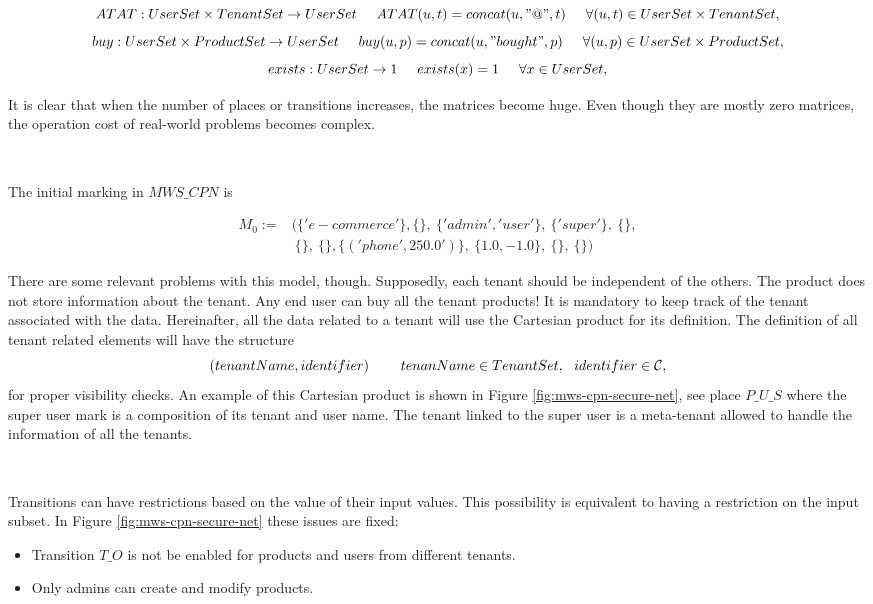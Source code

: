 \documentclass[12pt,english]{article} %
\begin{document}
$$ATAT: UserSet\times TenantSet\rightarrow UserSet\hspace{0.5cm}ATAT(u,t)=concat(u,"@",t) \hspace{0.5cm}\forall (u,t)\in UserSet\times TenantSet,$$
$$buy: UserSet\times ProductSet\rightarrow UserSet\hspace{0.5cm}buy(u,p)=concat(u, " bought ", p) \hspace{0.5cm}\forall (u,p)\in UserSet\times ProductSet,$$
$$exists: UserSet\rightarrow 1\hspace{0.5cm}exists(x)=1 \hspace{0.5cm}\forall x\in UserSet,$$


It is clear that when the number of places or transitions increases, the matrices become huge.
Even though they are mostly zero matrices, the operation cost of real-world problems becomes complex.

\

The initial marking in $MWS\_CPN$ is

$$
\begin{aligned}
  M_0 := & (\{'e-commerce'\},\{\}, \ \{'admin', 'user'\},\ \{'super'\},\ \{\}, \\
         &\  \{\}, \ \{\}, \{('phone', 250.0')\},\ \{1.0, -1.0\},\ \{\},\ \{\})
\end{aligned}
$$


There are some relevant problems with this model, though.
Supposedly, each tenant should be independent of the others.
The product does not store information about the tenant.
Any end user can buy all the tenant products!
It is mandatory to keep track of the tenant associated with the data.
Hereinafter, all the data related to a tenant will use the Cartesian product for its definition.
The definition of all tenant related elements will have the structure 
$$(tenantName, identifier)\hspace{0.8cm} tenanName\in TenantSet,\ \ identifier\in\mathcal{C},$$
for proper visibility checks.
An example of this Cartesian product is shown in Figure \ref{fig:mws-cpn-secure-net}, see place $P\_U\_S$ where the super user mark is a composition of its tenant and user name.
The tenant linked to the super user is a meta-tenant allowed to handle the information of all the tenants.

\

Transitions can have restrictions based on the value of their input values.
This possibility is equivalent to having a restriction on the input subset.
In Figure \ref{fig:mws-cpn-secure-net} these issues are fixed:
\begin{itemize}
    \item Transition $T\_O$ is not be enabled for products and users from different tenants.
    \item Only admins can create and modify products.
\end{itemize}
\end{document}
